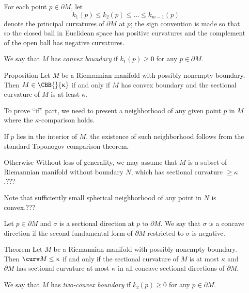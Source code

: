 For each point $p\in\partial M$,
let 
\[k_1(p)\le k_2(p)\le\dots\le k_{m-1}(p)\]
denote the principal curvatures
of $\partial M$ at $p$;
the sign convention is made so that
so the closed ball in Euclidean space has positive curvatures 
and the complement of the open ball has negative curvatures.

We say that $M$ has \emph{convex boundary} 
if $k_1(p)\ge 0$ for any $p\in\partial M$. 

\begin{thm}{Proposition}\label{prop:example-mnflds-with-bry:CBB}
Let $M$ be a Riemannian manifold with possibly nonempty boundary.
Then
$M\in\CBB{}{\kappa}$ 
if and only if $M$ has convex boundary 
and the sectional curvature of $M$ is at least $\kappa$.
\end{thm}

To prove ``if'' part, we need to present a neighborhood of any given point $p$ in $M$ where the $\kappa$-comparison holds.

If $p$ lies in the interior of $M$, 
the existence of such neighborhood 
follows from the standard Toponogov comparison theorem.

Otherwise 
Without loss of generality, we may assume that $M$ 
is a subset of Riemannian manifold without boundary $N$, 
which has sectional curvature $\ge \kappa$.???

Note that sufficiently small spherical neighborhood of 
any point in $N$ is convex.???\qeds


Let $p\in\partial M$ and $\sigma$ is a sectional direction at $p$ to $\partial M$.
We say that $\sigma$ is a concave direction if the second fundamental form of $\partial M$ restricted to $\sigma$ is negative.

\begin{thm}{Theorem}\label{thm:example-mnflds-with-bry:CBA}
Let $M$ be a Riemannian manifold with possibly nonempty boundary.
Then
$\curv M\le \kappa$
if and only if the sectional curvature of $M$ is at most $\kappa$
and $\partial M$ has sectional curvature at most $\kappa$ 
in all concave sectional directions of $\partial M$.
\end{thm}

We say that $M$ has \emph{two-convex boundary} 
if $k_2(p)\ge 0$ for any $p\in\partial M$.

%

